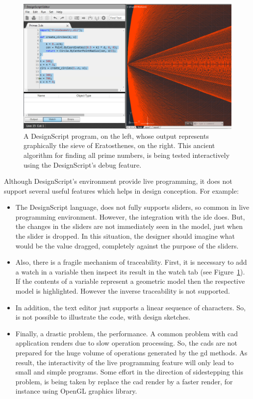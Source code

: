 \begin{figure}[h]
  \centering
  \includegraphics[scale=0.25]{img/designScript}
    \caption{A DesignScript program, on the left, whose output represents graphically the sieve of Eratosthenes, on the right. This ancient algorithm for finding all prime numbers, is being tested interactively using the DesignScript's debug feature. }
  \label{fig:ds}
\end{figure}

Although DesignScript's environment provide live programming, it does not support several useful features which helps in design conception. For example: 

\begin{itemize}
 
\item The DesignScript language, does not fully supports sliders, so common in live programming environment. However, the integration with the \ac{ide} does. But, the changes in the sliders are not immediately seen in the model, just when the slider is dropped. In this situation, the designer should imagine what would be the value dragged, completely against the purpose of the sliders. 

\item Also, there is a fragile mechanism of traceability. First, it is necessary to add a watch in a variable then inspect its result in the watch tab (see Figure~\ref{fig:ds}). If the contents of a variable represent a geometric model then the respective model is highlighted. However the inverse traceability is not supported. 

\item In addition, the text editor just supports a linear sequence of characters. So, is not possible to illustrate the code, with design sketches. 

\item Finally, a drastic problem, the performance. A common problem with \ac{cad} application renders due to slow operation processing. So, the \ac{cad}s are not prepared for the huge volume of operations generated by the \ac{gd} methods. As result, the interactivity of the live programming feature will only lead to small and simple programs. Some effort in the direction of sidestepping this problem, is being taken by replace the \ac{cad} render by a faster render, for instance using OpenGL graphics library. 
\end{itemize}

